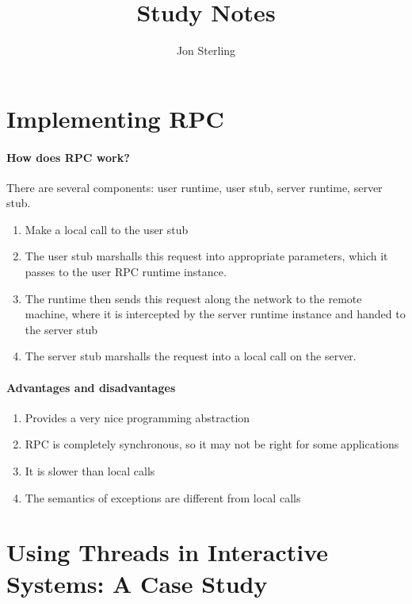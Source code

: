 \documentclass{article}
\title{\Emph{Systems} Study Notes}
\author{Jon Sterling}
\begin{document}
\maketitle


\section{Implementing RPC}

\paragraph{How does RPC work?}
There are several components: user runtime, user stub, server runtime,
server stub.

\begin{enumerate}
\item Make a local call to the user stub
\item The user stub marshalls this request into appropriate
  parameters, which it passes to the user RPC runtime instance.
\item The runtime then sends this request along the network to the
  remote machine, where it is intercepted by the server runtime
  instance and handed to the server stub
\item The server stub marshalls the request into a local call on the
  server.
\end{enumerate}

\paragraph{Advantages and disadvantages}

\begin{enumerate}
\item Provides a very nice programming abstraction
\item RPC is completely synchronous, so it may not be right for some applications
\item It is slower than local calls
\item The semantics of exceptions are different from local calls
\end{enumerate}

\section{Using Threads in Interactive Systems: A Case Study}
\end{document}
